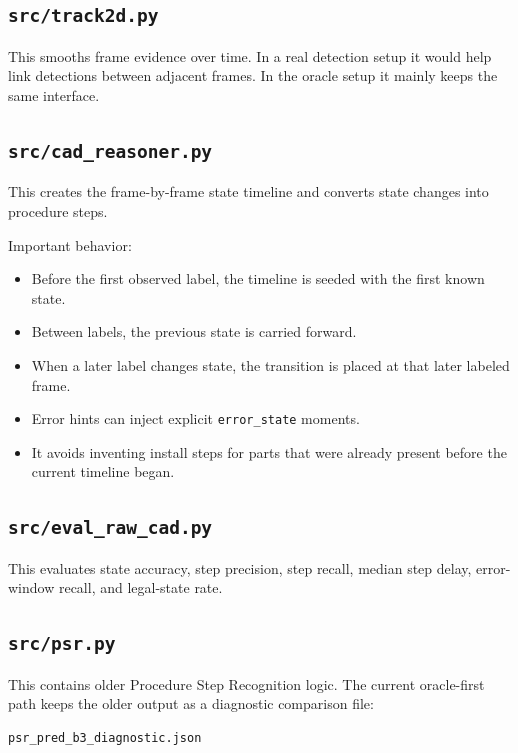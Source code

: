 \documentclass[11pt,a4paper]{article}
\begin{document}
\subsection{\texttt{src/track2d.py}}

This smooths frame evidence over time. In a real detection setup it would help link detections between adjacent frames. In the oracle setup it mainly keeps the same interface.

\subsection{\texttt{src/cad\_reasoner.py}}

This creates the frame-by-frame state timeline and converts state changes into procedure steps.

Important behavior:

\begin{itemize}[leftmargin=*]
    \item Before the first observed label, the timeline is seeded with the first known state.
    \item Between labels, the previous state is carried forward.
    \item When a later label changes state, the transition is placed at that later labeled frame.
    \item Error hints can inject explicit \texttt{error\_state} moments.
    \item It avoids inventing install steps for parts that were already present before the current timeline began.
\end{itemize}

\subsection{\texttt{src/eval\_raw\_cad.py}}

This evaluates state accuracy, step precision, step recall, median step delay, error-window recall, and legal-state rate.

\subsection{\texttt{src/psr.py}}

This contains older Procedure Step Recognition logic. The current oracle-first path keeps the older output as a diagnostic comparison file:

\begin{lstlisting}
psr_pred_b3_diagnostic.json
\end{lstlisting}
\end{document}
